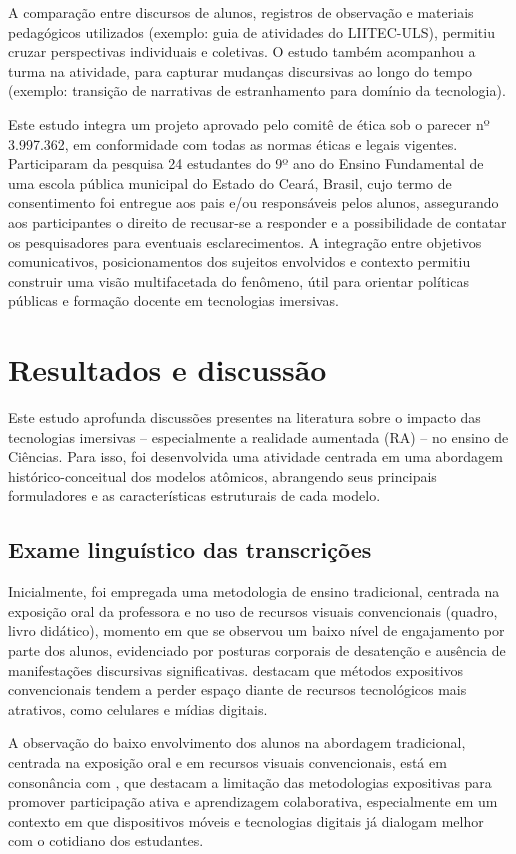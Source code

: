 \documentclass[portuguese]{textolivre}
\begin{document}
A comparação entre discursos de alunos, registros de observação e materiais pedagógicos utilizados (exemplo: guia de atividades do LIITEC-ULS), permitiu cruzar perspectivas individuais e coletivas. O estudo também acompanhou a turma na atividade, para capturar mudanças discursivas ao longo do tempo (exemplo: transição de narrativas de estranhamento para domínio da tecnologia).

Este estudo integra um projeto aprovado pelo comitê de ética sob o parecer nº 3.997.362, em conformidade com todas as normas éticas e legais vigentes. Participaram da pesquisa 24 estudantes do 9º ano do Ensino Fundamental de uma escola pública municipal do Estado do Ceará, Brasil, cujo termo de consentimento foi entregue aos pais e/ou responsáveis pelos alunos, assegurando aos participantes o direito de recusar-se a responder e a possibilidade de contatar os pesquisadores para eventuais esclarecimentos. A integração entre objetivos comunicativos, posicionamentos dos sujeitos envolvidos e contexto permitiu construir uma visão multifacetada do fenômeno, útil para orientar políticas públicas e formação docente em tecnologias imersivas.

\section{Resultados e discussão}
Este estudo aprofunda discussões presentes na literatura sobre o impacto das tecnologias imersivas -- especialmente a realidade aumentada (RA) -- no ensino de Ciências. Para isso, foi desenvolvida uma atividade centrada em uma abordagem histórico-conceitual dos modelos atômicos, abrangendo seus principais formuladores e as características estruturais de cada modelo.

\subsection{Exame linguístico das transcrições}
Inicialmente, foi empregada uma metodologia de ensino tradicional, centrada na exposição oral da professora e no uso de recursos visuais convencionais (quadro, livro didático), momento em que se observou um baixo nível de engajamento por parte dos alunos, evidenciado por posturas corporais de desatenção e ausência de manifestações discursivas significativas. \textcite{sousa2021} destacam que métodos expositivos convencionais tendem a perder espaço diante de recursos tecnológicos mais atrativos, como celulares e mídias digitais.

A observação do baixo envolvimento dos alunos na abordagem tradicional, centrada na exposição oral e em recursos visuais convencionais, está em consonância com \textcite{nascimento2016, nascimento2017}, que destacam a limitação das metodologias expositivas para promover participação ativa e aprendizagem colaborativa, especialmente em um contexto em que dispositivos móveis e tecnologias digitais já dialogam melhor com o cotidiano dos estudantes.
\end{document}
